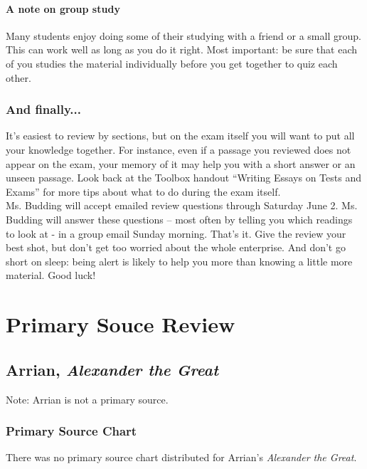 \documentclass{article}
\begin{document}
    \paragraph{A note on group study}
    Many students enjoy doing some of their studying with a friend or a small group. This
    can work well as long as you do it right. Most important: be sure that each of you
    studies the material individually before you get together to quiz each other.
  \subsubsection{And finally...}
  It’s easiest to review by sections, but on the exam itself you will want to put all your
  knowledge together.  For instance, even if a passage you reviewed does not appear on
  the exam, your memory of it may help you with a short answer or an unseen passage.
  Look back at the Toolbox handout “Writing Essays on Tests and Exams” for more tips
  about what to do during the exam itself.  \\
  Ms. Budding will accept emailed review questions through Saturday June 2. Ms. Budding
  will answer these questions – most often by telling you which readings to look at - in a
  group email Sunday morning.  That’s it. Give the review your best shot, but don’t get too
  worried about the whole enterprise.   And don’t go short on sleep: being alert is likely to
  help you more than knowing a little more material.  Good luck!
\section{Primary Souce Review}
\subsection*{Arrian, \textit{Alexander the Great}}
Note: Arrian is not a primary source.
\subsubsection*{Primary Source Chart}
There was no primary source chart distributed for Arrian's \textit{Alexander the Great}.
\end{document}
